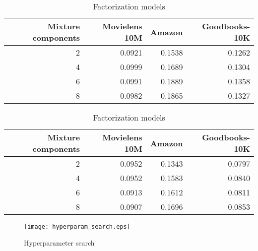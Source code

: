\documentclass[sigconf]{acmart}
\begin{document}
\begin{table}
\caption{Effect of number of mixture components}
\label{tab:nummixtures}
\begin{subtable}{\columnwidth}
\caption{Sequence models}
\begin{tabular}{rrrr}
\toprule
   Mixture components &   Movielens 10M &   Amazon &   Goodbooks-10K \\
\midrule
                    2 &          0.0921 &   0.1538 &          0.1262 \\
                    4 &          0.0999 &   0.1689 &          0.1304 \\
                    6 &          0.0991 &   0.1889 &          0.1358 \\
                    8 &          0.0982 &   0.1865 &          0.1327 \\
\bottomrule
\end{tabular}
\end{subtable}
\begin{subtable}{\columnwidth}
\caption{Factorization models}
\begin{tabular}{rrrr}
\toprule
   Mixture components &   Movielens 10M &   Amazon &   Goodbooks-10K \\
\midrule
                    2 &          0.0952 &   0.1343 &          0.0797 \\
                    4 &          0.0952 &   0.1583 &          0.0840 \\
                    6 &          0.0913 &   0.1612 &          0.0811 \\
                    8 &          0.0907 &   0.1696 &          0.0853 \\
\bottomrule
\end{tabular}
\end{subtable}\end{table}


\begin{figure*}[h]
  \caption{Hyperparameter search}
  \label{fig:hyper}
  \texttt{[image: hyperparam\_search.eps]}
\end{figure*}


\end{document}
